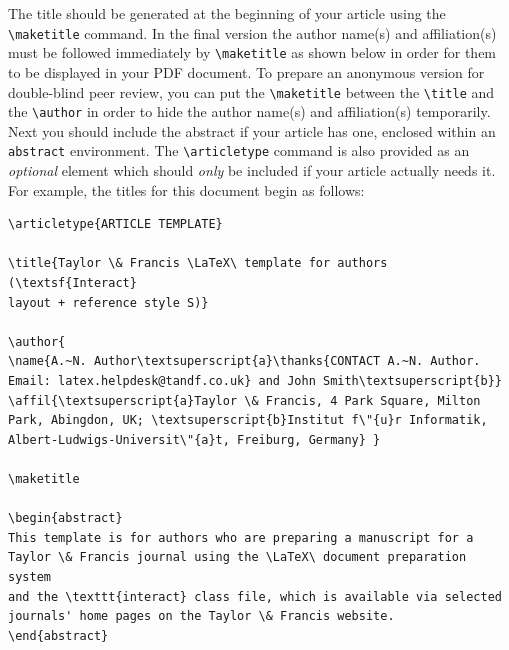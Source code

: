 \documentclass[]{interact}
\theoremstyle{plain}%
\theoremstyle{definition}
\theoremstyle{remark}
\begin{document}
The title should be generated at the beginning of your article using the \verb"\maketitle" command.
In the final version the author name(s) and affiliation(s) must be followed immediately by \verb"\maketitle" as shown below in order for them to be displayed in your PDF document.
To prepare an anonymous version for double-blind peer review, you can put the \verb"\maketitle" between the \verb"\title" and the \verb"\author" in order to hide the author name(s) and affiliation(s) temporarily.
Next you should include the abstract if your article has one, enclosed within an \texttt{abstract} environment.
The \verb"\articletype" command is also provided as an \emph{optional} element which should \emph{only} be included if your article actually needs it.
For example, the titles for this document begin as follows:
\begin{verbatim}
\articletype{ARTICLE TEMPLATE}

\title{Taylor \& Francis \LaTeX\ template for authors (\textsf{Interact}
layout + reference style S)}

\author{
\name{A.~N. Author\textsuperscript{a}\thanks{CONTACT A.~N. Author.
Email: latex.helpdesk@tandf.co.uk} and John Smith\textsuperscript{b}}
\affil{\textsuperscript{a}Taylor \& Francis, 4 Park Square, Milton
Park, Abingdon, UK; \textsuperscript{b}Institut f\"{u}r Informatik,
Albert-Ludwigs-Universit\"{a}t, Freiburg, Germany} }

\maketitle

\begin{abstract}
This template is for authors who are preparing a manuscript for a
Taylor \& Francis journal using the \LaTeX\ document preparation system
and the \texttt{interact} class file, which is available via selected
journals' home pages on the Taylor \& Francis website.
\end{abstract}
\end{verbatim}
\end{document}

